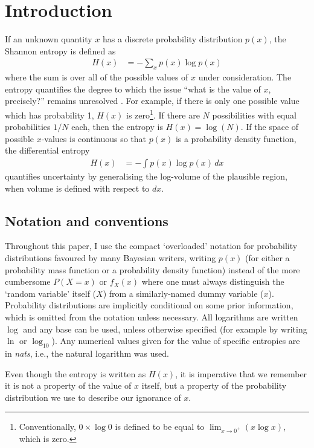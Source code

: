 \documentclass[entropy,article,accept,oneauthor,pdftex,10pt,a4paper]{mdpi}
\begin{document}

\section{Introduction}

If an unknown quantity $x$ has a discrete probability distribution $p(x)$,
the Shannon entropy \citep{shannon} is defined as
\begin{align}
H(x) &= -\sum_{x} p(x) \log p(x)
\end{align}
where the sum is over all of the possible values of $x$ under consideration.
The entropy quantifies the degree to which the issue
``what is the value of $x$, precisely?'' remains unresolved
\citep{knuth_questions}. For example,
if there is only one possible value which has probability 1, $H(x)$ is
zero\footnote{Conventionally, $0 \times \log 0$ is defined to be equal
to $\lim_{x \to 0^+} (x\log x)$, which is zero.}.
If there are $N$ possibilities with equal probabilities $1/N$ each,
then the entropy is $H(x) = \log(N)$.
If the space of possible $x$-values is continuous so that $p(x)$ is a
probability density function, the differential entropy
\begin{align}
H(x) &= -\int p(x) \log p(x) \, dx
\end{align}
quantifies uncertainty by generalising the log-volume
of the plausible region, when volume is defined with respect to $dx$.

\subsection{Notation and conventions}

Throughout this paper, I use the compact
`overloaded' notation for probability distributions favoured by many
Bayesian writers, writing $p(x)$ (for either a probability mass function
or a probability density function) instead
of the more cumbersome $P(X=x)$ or $f_X(x)$ where one must always
distinguish the `random variable' itself ($X$) from a similarly-named
dummy variable ($x$).
Probability distributions are implicitly conditional on some prior
information, which is omitted from the notation unless necessary.
All logarithms are written $\log$ and any base can be used, unless otherwise
specified (for example by writing $\ln$ or $\log_{10}$). Any numerical
values given for the value of specific entropies are in {\em nats}, i.e.,
the natural logarithm was used.

Even though the entropy is written as $H(x)$, it is imperative that we
remember it is not a property of the value of $x$ itself, but a property
of the probability distribution we use to describe our ignorance of $x$.
\end{document}
